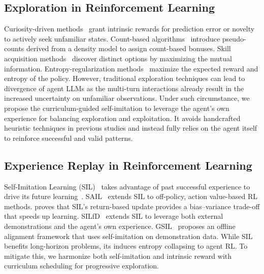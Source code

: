 \documentclass[]{youtu} %
\begin{document}
\subsection{Exploration in Reinforcement Learning}

Curiosity-driven methods~\cite{pathak2017curiosity,houthooft2016vime} grant intrinsic rewards for prediction error or novelty to actively seek unfamiliar states.
Count-based algorithms~\cite{bellemare2016unifying,tang2017exploration} introduce pseudo-counts derived from a density model to assign count-based bonuses.
Skill acquisition methods~\cite{gregor2016variational,eysenbach2018diversity} discover distinct options by maximizing the mutual information.
Entropy-regularization methods~\cite{haarnoja2018soft,cui2025entropy} maximize the expected reward and entropy of the policy.
However,
traditional exploration techniques can lead to divergence of agent LLMs as the multi-turn interactions already result in the increased uncertainty on unfamiliar observations.
Under such circumstance,
we propose the curriculum-guided self-imitation to leverage the agent's own experience for balancing exploration and exploitation.
It avoids handcrafted heuristic techniques in previous studies and instead fully relies on the agent itself to reinforce successful and valid patterns.




\subsection{Experience Replay in Reinforcement Learning}

Self-Imitation Learning (SIL)~\cite{oh2018self} takes advantage of past successful experience to drive its future learning~\cite{schaul2015prioritized,horgan2018distributed,gangwani2018learning,pan2022understanding,saglam2023actor}.
SAIL~\cite{ferret2020self} extends SIL to off-policy, action value-based RL methods.
\cite{tang2020self} proves that SIL's return-based update provides a bias–variance trade-off that speeds up learning.
SILfD~\cite{pshikhachev2022self} extends SIL to leverage both external demonstrations and the agent's own experience.
GSIL~\cite{xiao2024leverage} proposes an offline alignment framework that uses self-imitation on demonstration data.
While SIL benefits long-horizon problems,
its induces entropy collapsing to agent RL.
To mitigate this, we harmonize both self-imitation and intrinsic reward with curriculum scheduling for progressive exploration.
\end{document}
